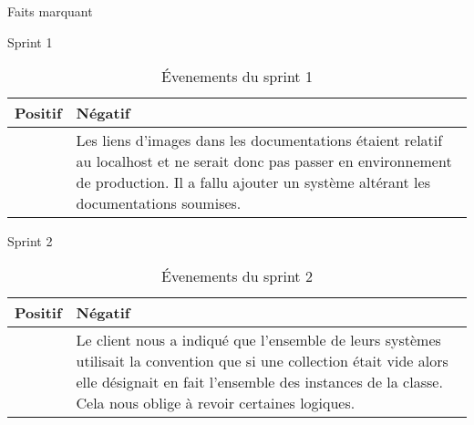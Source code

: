 \documentclass[]{article}
\begin{document}
{\begin{section}{Faits marquant}
    \begin{subsection}{Sprint 1}
        \begin{table}[H]
            \caption{Évenements du sprint 1}
            \begin{tabularx}{\columnwidth}{|X|X|}
                \hline
                \cellcolor[HTML]{17FF00}Positif & \cellcolor[HTML]{FF2D00}Négatif\\
                \hline
                 & Les liens d'images dans les documentations étaient relatif au localhost et ne serait donc pas passer en environnement de production. Il a fallu ajouter un système altérant les documentations soumises.\\
                \hline
            \end{tabularx}
        \end{table}
    \end{subsection}

    \begin{subsection}{Sprint 2}
        \begin{table}[H]
            \caption{Évenements du sprint 2}
            \begin{tabularx}{\columnwidth}{|X|X|}
                \hline
                \cellcolor[HTML]{17FF00}Positif & \cellcolor[HTML]{FF2D00}Négatif\\
                \hline
                 & Le client nous a indiqué que l'ensemble de leurs systèmes utilisait la convention que si une collection était vide alors elle désignait en fait l'ensemble des instances de la classe. Cela nous oblige à revoir certaines logiques.\\
                \hline
            \end{tabularx}
        \end{table}
    \end{subsection}


\end{section}}
\end{document}
